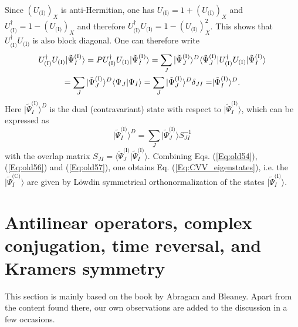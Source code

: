 Since $(U_\text{(I)})_X$ is anti-Hermitian, one has $U_\text{(I)} = 1 + (U_\text{(I)})_X$ and $U_\text{(I)}^\dagger = 1 - (U_\text{(I)})_X$ and therefore $U_\text{(I)}^\dag U_\text{(I)} = 1 - (U_\text{(I)})_X^2$. This shows that $U_\text{(I)}^\dag U_\text{(I)}$ is also block diagonal. One can therefore write
	\begin{equation}
	\label{Eq:old56}
	\begin{gathered}
  U_\text{(I)}^\dag U_\text{(I)}|\tilde \Psi _I^\text{(I)}\rangle  = PU_\text{(I)}^\dag U_\text{(I)}|\tilde \Psi _I^\text{(I)}\rangle  = \sum\limits_J {|\tilde \Psi _J^\text{(I)}{\rangle ^D}\langle } \tilde \Psi _J^\text{(I)}|U_\text{(I)}^\dag U_\text{(I)}|\tilde \Psi _I^\text{(I)}\rangle  \hfill \\
   = \sum\limits_J {|\tilde \Psi _J^\text{(I)}{\rangle ^D}\langle } {\Psi _J}|{\Psi _I}\rangle  = \sum\limits_J {|\tilde \Psi _J^\text{(I)}{\rangle ^D}{\delta _{JI}} = } |\tilde \Psi _I^\text{(I)}{\rangle ^D}. 
\end{gathered} 
\end{equation} 	
Here $|\tilde \Psi _I^\text{(I)}{\rangle ^D}$ is the dual (contravariant) state with respect to $|\tilde \Psi _I^\text{(I)}\rangle$, which can be expressed as
	\begin{equation}
	\label{Eq:old57}
	|\tilde \Psi _I^\text{(I)}{\rangle ^D} = \sum\limits_J {|\tilde \Psi _J^\text{(I)}\rangle S_{JI}^{ - 1}} 
	\end{equation} 	
with the overlap matrix ${S_{JI}} = \langle \tilde \Psi _J^\text{(I)}|\tilde \Psi _I^\text{(I)}\rangle $. Combining Eqs. (\ref{Eq:old54}), (\ref{Eq:old56}) and (\ref{Eq:old57}), one obtains Eq. (\ref{Eq:CVV_eigenstates}), i.e. the $|\tilde{\Psi}_I^\text{(C)}\rangle$ are given by Löwdin symmetrical orthonormalization of the states $|\tilde{\Psi}_I^\text{(I)}\rangle$.

\section{Antilinear operators, complex conjugation, time reversal, and Kramers symmetry}
This section is mainly based on the book by Abragam and Bleaney.\cite{AbragB_2012_} Apart from the content found there, our own observations are added to the discussion in a few occasions.
